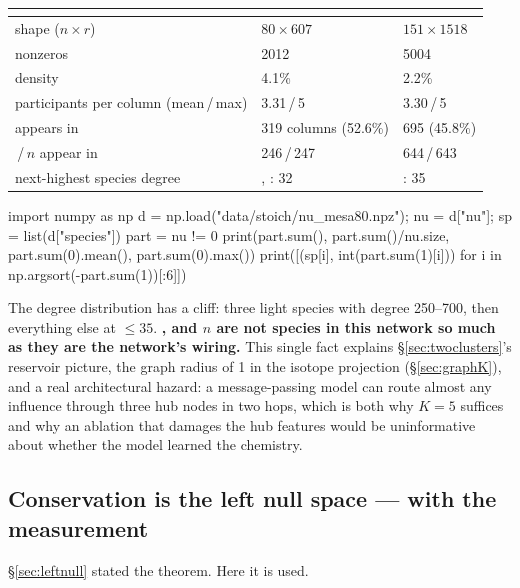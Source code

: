 \begin{center}
\begin{tabularx}{\textwidth}{@{}Y L{3.4cm} L{3.4cm}@{}}
\toprule
 & \textbf{} & \textbf{} \\
\midrule
shape ($n \times r$) & $80 \times 607$ & $151 \times 1518$ \\
nonzeros & 2012 & 5004 \\
density & 4.1\% & 2.2\% \\
participants per column (mean\,/\,max) & 3.31\,/\,5 & 3.30\,/\,5 \\
 appears in & 319 columns (52.6\%) & 695 (45.8\%) \\
\,/\,$n$ appear in & 246\,/\,247 & 644\,/\,643 \\
next-highest species degree & , : 32 &
  : 35 \\
\bottomrule
\end{tabularx}
\end{center}

\begin{srclisting}
import numpy as np
d = np.load("data/stoich/nu_mesa80.npz"); nu = d["nu"]; sp = list(d["species"])
part = nu != 0
print(part.sum(), part.sum()/nu.size, part.sum(0).mean(), part.sum(0).max())
print([(sp[i], int(part.sum(1)[i])) for i in np.argsort(-part.sum(1))[:6]])
\end{srclisting}

The degree distribution has a cliff: three light species with degree 250--700,
then everything else at $\le 35$. \textbf{,  and $n$ are
not species in this network so much as they are the network's wiring.} This
single fact explains \S\ref{sec:twoclusters}'s reservoir picture, the graph
radius of 1 in the isotope projection (\S\ref{sec:graphK}), and a real
architectural hazard: a message-passing model can route almost any influence
through three hub nodes in two hops, which is both why $K = 5$ suffices and why
an ablation that damages the hub features would be uninformative about whether
the model learned the chemistry.

\subsection{Conservation is the left null space --- with the measurement}
\label{sec:leftnullspace}

\S\ref{sec:leftnull} stated the theorem. Here it is used.

